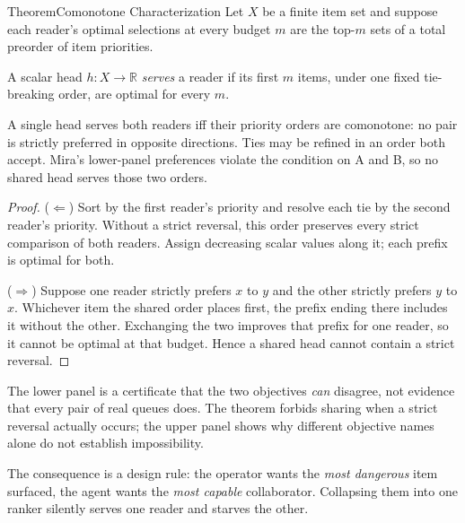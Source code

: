 \documentclass[11pt,a4paper]{article}
\theoremstyle{definition}
\theoremstyle{plain}
\begin{document}
\begin{pdclaim}{Theorem}{Comonotone Characterization}
\setlength{\parskip}{4pt plus 1pt}
\label{thm:comonotone}
Let $X$ be a finite item set and suppose each reader's optimal selections at
every budget $m$ are the top-$m$ sets of a total preorder of item priorities.

A scalar head $h:X\to\mathbb R$ \emph{serves} a reader if its first $m$ items,
under one fixed tie-breaking order, are optimal for every $m$.

A single head serves both readers iff their priority orders are comonotone:
no pair is strictly preferred in opposite directions. Ties may be refined
in an order both accept. Mira's lower-panel preferences violate the
condition on A and B, so no shared head serves those two orders.
\end{pdclaim}
\begin{proof}
\setlength{\parskip}{4pt plus 1pt}
($\Leftarrow$) Sort by the first reader's priority and resolve each tie by
the second reader's priority. Without a strict reversal, this order
preserves every strict comparison of both readers. Assign decreasing
scalar values along it; each prefix is optimal for both.

($\Rightarrow$) Suppose one reader strictly prefers $x$ to $y$ and the
other strictly prefers $y$ to $x$. Whichever item the shared order places
first, the prefix ending there includes it without the other. Exchanging
the two improves that prefix for one reader, so it cannot be optimal at
that budget. Hence a shared head cannot contain a strict reversal.
\end{proof}
The lower panel is a certificate that the two objectives \emph{can}
disagree, not evidence that every pair of real queues does. The theorem
forbids sharing when a strict reversal actually occurs; the upper panel
shows why different objective names alone do not establish impossibility.

The consequence is a design rule: the operator wants the \emph{most dangerous} item
surfaced, the agent wants the \emph{most capable} collaborator. Collapsing them into
one ranker silently serves one reader and starves the other.
\end{document}
